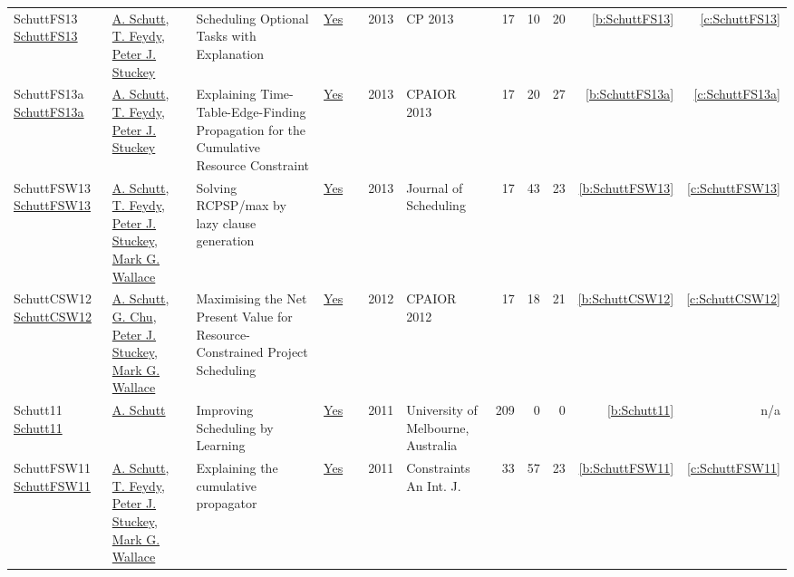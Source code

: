 {\begin{longtable}{>{\raggedright\arraybackslash}p{3cm}>{\raggedright\arraybackslash}p{6cm}>{\raggedright\arraybackslash}p{6.5cm}rrrp{2.5cm}rrrrr}
SchuttFS13 \href{https://doi.org/10.1007/978-3-642-40627-0\_47}{SchuttFS13} & \hyperref[auth:a125]{A. Schutt}, \hyperref[auth:a155]{T. Feydy}, \hyperref[auth:a126]{Peter J. Stuckey} & Scheduling Optional Tasks with Explanation & \href{../works/SchuttFS13.pdf}{Yes} & \cite{SchuttFS13} & 2013 & CP 2013 & 17 & 10 & 20 & \ref{b:SchuttFS13} & \ref{c:SchuttFS13}\\
SchuttFS13a \href{https://doi.org/10.1007/978-3-642-38171-3\_16}{SchuttFS13a} & \hyperref[auth:a125]{A. Schutt}, \hyperref[auth:a155]{T. Feydy}, \hyperref[auth:a126]{Peter J. Stuckey} & Explaining Time-Table-Edge-Finding Propagation for the Cumulative Resource Constraint & \href{../works/SchuttFS13a.pdf}{Yes} & \cite{SchuttFS13a} & 2013 & CPAIOR 2013 & 17 & 20 & 27 & \ref{b:SchuttFS13a} & \ref{c:SchuttFS13a}\\
SchuttFSW13 \href{https://doi.org/10.1007/s10951-012-0285-x}{SchuttFSW13} & \hyperref[auth:a125]{A. Schutt}, \hyperref[auth:a155]{T. Feydy}, \hyperref[auth:a126]{Peter J. Stuckey}, \hyperref[auth:a156]{Mark G. Wallace} & Solving RCPSP/max by lazy clause generation & \href{../works/SchuttFSW13.pdf}{Yes} & \cite{SchuttFSW13} & 2013 & Journal of Scheduling & 17 & 43 & 23 & \ref{b:SchuttFSW13} & \ref{c:SchuttFSW13}\\
SchuttCSW12 \href{https://doi.org/10.1007/978-3-642-29828-8\_24}{SchuttCSW12} & \hyperref[auth:a125]{A. Schutt}, \hyperref[auth:a349]{G. Chu}, \hyperref[auth:a126]{Peter J. Stuckey}, \hyperref[auth:a156]{Mark G. Wallace} & Maximising the Net Present Value for Resource-Constrained Project Scheduling & \href{../works/SchuttCSW12.pdf}{Yes} & \cite{SchuttCSW12} & 2012 & CPAIOR 2012 & 17 & 18 & 21 & \ref{b:SchuttCSW12} & \ref{c:SchuttCSW12}\\
Schutt11 \href{https://www.a4cp.org/sites/default/files/andreas_schutt_-_improving_scheduling_by_learning.pdf}{Schutt11} & \hyperref[auth:a125]{A. Schutt} & Improving Scheduling by Learning & \href{../works/Schutt11.pdf}{Yes} & \cite{Schutt11} & 2011 & University of Melbourne, Australia & 209 & 0 & 0 & \ref{b:Schutt11} & n/a\\
SchuttFSW11 \href{https://doi.org/10.1007/s10601-010-9103-2}{SchuttFSW11} & \hyperref[auth:a125]{A. Schutt}, \hyperref[auth:a155]{T. Feydy}, \hyperref[auth:a126]{Peter J. Stuckey}, \hyperref[auth:a156]{Mark G. Wallace} & Explaining the cumulative propagator & \href{../works/SchuttFSW11.pdf}{Yes} & \cite{SchuttFSW11} & 2011 & Constraints An Int. J. & 33 & 57 & 23 & \ref{b:SchuttFSW11} & \ref{c:SchuttFSW11}\\

\end{longtable}}
